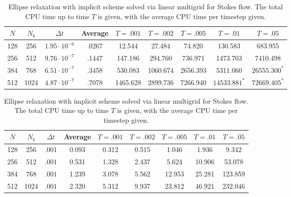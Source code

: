 \documentclass[preprint,12pt]{elsarticle}
\begin{document}
\begin{table}
\caption{Ellipse relaxation with Forward Euler/Backward Euler scheme for Stokes flow. The total CPU time up to time $T$ is given, with the average CPU time per timestep given.}
\label{table:EllipseFEBESimsStokes}
\begin{center}
\begin{tabular}{|c||c c|c|c c c c c|}
\hline
$N$ & $N_b$ & $\Delta t$ & Average & $T=.001$ & $T=.002$ & $T=.005$ &$T=.01$ &$T=.05$\\
\hline
128 & 256 & $1.95\cdot 10^{-6}$ & .0267 & 12.544 & 27.484 & 74.820 & 130.583 & 683.955 \\
256 & 512 & $9.76\cdot 10^{-7}$ & .1447 & 147.186 & 294.760 & 736.971 & 1473.703 & 7410.498\\
384 & 768 & $6.51\cdot 10^{-7}$ & .3458 & 530.083 & 1060.674 & 2656.393 & 5311.060 & $26555.300^*$\\
512 & 1024 & $4.87\cdot 10^{-7}$ & .7078 & 1465.628 & 2899.736 & 7266.940 & $14533.881^*$ & $72669.405^*$\\
\hline
\end{tabular}
\end{center}

\caption{Ellipse relaxation with implicit scheme solved via linear multigrid for Stokes flow. The total CPU time up to time $T$ is given, with the average CPU time per timestep given.}
\label{table:EllipseImplicitSimsStokes}
\begin{center}
\begin{tabular}{|c||c c|c|c c c c c|}
\hline
$N$ & $N_b$ & $\Delta t$ & Average & $T=.001$ & $T=.002$ & $T=.005$ &$T=.01$ &$T=.05$\\
\hline
128 & 256 & $.001$ & 0.093 & 0.312 & 0.515 & 1.046 & 1.936 & 9.342\\
256 & 512 & $.001$ & 0.531 & 1.328 & 2.437 & 5.624 & 10.906 & 53.078\\
384 & 768 & $.001$ & 1.239 & 3.078 & 5.562 & 12.953 & 25.281 & 123.859\\
512 & 1024 & $.001$ & 2.320 & 5.312 & 9.937 & 23.812 & 46.921 & 232.046\\
\hline
\end{tabular}
\end{center}


\end{table}
\end{document}
